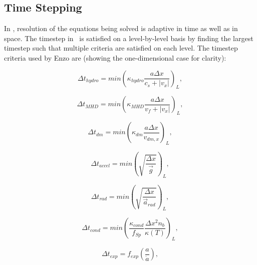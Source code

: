 \subsection{Time Stepping}
\label{sec.timestepping}


In \enzo, resolution of the equations being solved is adaptive in time 
as well as in space.  The timestep in \enzo\ is satisfied on a level-by-level
 basis by finding the largest timestep such that multiple criteria are
satisfied on each level.  The timestep criteria used by Enzo are 
(showing the one-dimensional case for clarity):

\begin{equation}
\Delta t_{hydro} = min \left( \kappa_{hydro} \frac{a \Delta x}{c_{s} + |v_x|} \right)_L ,
\label{eqn:dthydro}
\end{equation}

\begin{equation}
\Delta t_{MHD} = min \left( \kappa_{MHD} \frac{a \Delta x}{v_{f} + |v_x|} \right)_L ,
\label{eqn:dtMHD}
\end{equation}

\begin{equation}
\Delta t_{dm} = min \left(\kappa_{dm} \frac{a \Delta x}{v_{dm,x}} \right)_L ,
\label{eqn:dtdarkmatter}
\end{equation}

\begin{equation}
\Delta t_{accel} = min \left( \sqrt{\frac{\Delta x}{\vec{g}}} \right)_L ,
\label{eqn:dtaccel}
\end{equation}

\begin{equation}
\Delta t_{rad} = min \left(  \sqrt{\frac{\Delta x}{\vec{a}_{rad}}} \right)_L,
\label{eqn:dtrad}
\end{equation}

\begin{equation}
\Delta t_{cond} = min \left(  \frac{ \kappa_{cond}}{f_{Sp}} \frac{\Delta x^2
    n_b}{\kappa(T)} \right)_L,
\label{eqn:dtcond}
\end{equation}

\begin{equation}
\Delta t_{exp} = f_{exp} \left( \frac{a}{\dot{a}} \right) ,
\label{eqn:dtexpand}
\end{equation}


